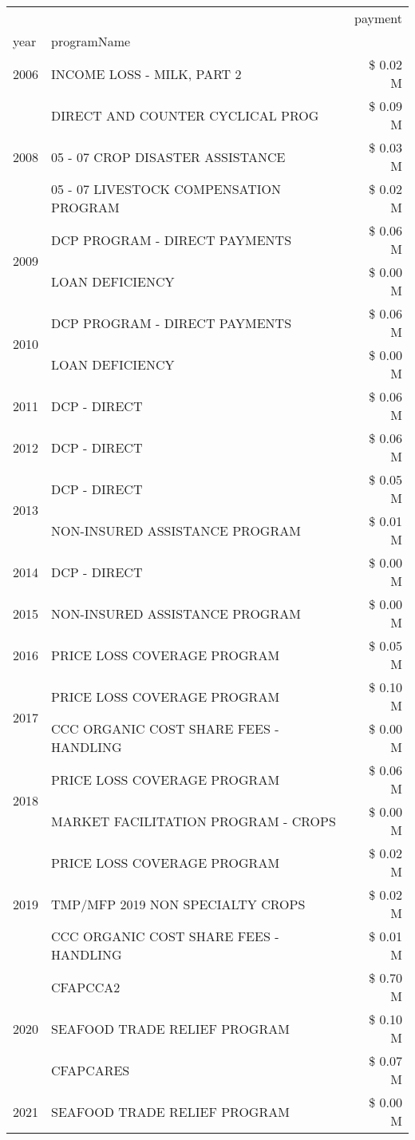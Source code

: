 \begin{tabular}{llr}
\toprule
 &  & payment \\
year & programName &  \\
\midrule
2006 & INCOME LOSS - MILK, PART 2 & \$ 0.02 M \\
\cline{1-3}
\multirow[t]{3}{*}{2008} & DIRECT AND COUNTER CYCLICAL PROG & \$ 0.09 M \\
 & 05 - 07 CROP DISASTER ASSISTANCE & \$ 0.03 M \\
 & 05 - 07 LIVESTOCK COMPENSATION PROGRAM & \$ 0.02 M \\
\cline{1-3}
\multirow[t]{2}{*}{2009} & DCP PROGRAM - DIRECT PAYMENTS & \$ 0.06 M \\
 & LOAN DEFICIENCY & \$ 0.00 M \\
\cline{1-3}
\multirow[t]{2}{*}{2010} & DCP PROGRAM - DIRECT PAYMENTS & \$ 0.06 M \\
 & LOAN DEFICIENCY & \$ 0.00 M \\
\cline{1-3}
2011 & DCP - DIRECT & \$ 0.06 M \\
\cline{1-3}
2012 & DCP - DIRECT & \$ 0.06 M \\
\cline{1-3}
\multirow[t]{2}{*}{2013} & DCP - DIRECT & \$ 0.05 M \\
 & NON-INSURED ASSISTANCE PROGRAM & \$ 0.01 M \\
\cline{1-3}
2014 & DCP - DIRECT & \$ 0.00 M \\
\cline{1-3}
2015 & NON-INSURED ASSISTANCE PROGRAM & \$ 0.00 M \\
\cline{1-3}
2016 & PRICE LOSS COVERAGE PROGRAM & \$ 0.05 M \\
\cline{1-3}
\multirow[t]{2}{*}{2017} & PRICE LOSS COVERAGE PROGRAM & \$ 0.10 M \\
 & CCC ORGANIC COST SHARE FEES - HANDLING & \$ 0.00 M \\
\cline{1-3}
\multirow[t]{2}{*}{2018} & PRICE LOSS COVERAGE PROGRAM & \$ 0.06 M \\
 & MARKET FACILITATION PROGRAM - CROPS & \$ 0.00 M \\
\cline{1-3}
\multirow[t]{3}{*}{2019} & PRICE LOSS COVERAGE PROGRAM & \$ 0.02 M \\
 & TMP/MFP 2019 NON SPECIALTY CROPS & \$ 0.02 M \\
 & CCC ORGANIC COST SHARE FEES - HANDLING & \$ 0.01 M \\
\cline{1-3}
\multirow[t]{3}{*}{2020} & CFAPCCA2 & \$ 0.70 M \\
 & SEAFOOD TRADE RELIEF PROGRAM & \$ 0.10 M \\
 & CFAPCARES & \$ 0.07 M \\
\cline{1-3}
2021 & SEAFOOD TRADE RELIEF PROGRAM & \$ 0.00 M \\
\cline{1-3}
\bottomrule
\end{tabular}
